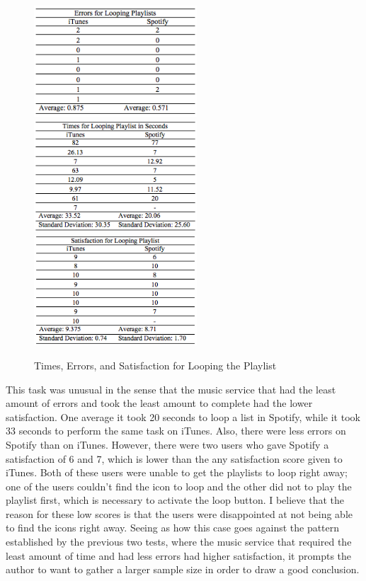 \documentclass[11pt]{article}
\begin{document}
\begin{figure}[H] %
   \centering
   \includegraphics[width=2.4in]{errors_loop.png}       
   \includegraphics[width=2.4in]{times_loop.png}
   \includegraphics[width=2.4in]{satisfaction_looping.png}        
   \caption{Times, Errors, and Satisfaction for Looping the Playlist}
   \label{fig:loop}
\end{figure}

This task was unusual in the sense that the music service that had the least amount of errors and took the least amount to complete had the lower satisfaction. One average it took 20 seconds to loop a list in Spotify, while it took 33 seconds to perform the same task on iTunes. Also, there were less errors on Spotify than on iTunes. However, there were two users who gave Spotify a satisfaction of 6 and 7, which is lower than the any satisfaction score given to iTunes. Both of these users were unable to get the playlists to loop right away; one of the users couldn't find the icon to loop and the other did not to play the playlist first, which is necessary to activate the loop button. I believe that the reason for these low scores is that the users were disappointed at not being able to find the icons right away. Seeing as how this case goes against the pattern established by the previous two tests, where the music service that required the least amount of time and had less errors had higher satisfaction,   it prompts the author to want to gather a larger sample size in order to draw a good conclusion. 
\end{document}
